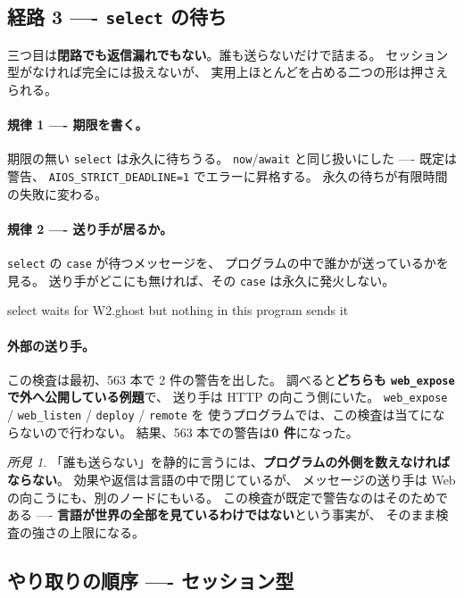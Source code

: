 \documentclass[11pt,a4paper]{ltjsarticle}
\theoremstyle{definition}
\theoremstyle{remark}
\newtheorem{finding}[theorem]{所見}
\begin{document}
\subsection{経路 3 ---- \texttt{select} の待ち}
\label{sec:select3}

三つ目は\textbf{閉路でも返信漏れでもない}。誰も送らないだけで詰まる。
セッション型がなければ完全には扱えないが、
実用上ほとんどを占める二つの形は押さえられる。

\paragraph{規律 1 ---- 期限を書く。}
期限の無い \texttt{select} は永久に待ちうる。
\texttt{now}/\texttt{await} と同じ扱いにした ---- 既定は警告、
\texttt{AIOS\_STRICT\_DEADLINE=1} でエラーに昇格する。
永久の待ちが有限時間の失敗に変わる。

\paragraph{規律 2 ---- 送り手が居るか。}
\texttt{select} の \texttt{case} が待つメッセージを、
プログラムの中で誰かが送っているかを見る。
送り手がどこにも無ければ、その \texttt{case} は永久に発火しない。

\begin{term}
[warn] select waits for W2.ghost but nothing in this program sends it
\end{term}

\paragraph{外部の送り手。}
この検査は最初、563 本で 2 件の警告を出した。
調べると\textbf{どちらも \texttt{web\_expose} で外へ公開している例題}で、
送り手は HTTP の向こう側にいた。
\texttt{web\_expose} / \texttt{web\_listen} / \texttt{deploy} / \texttt{remote} を
使うプログラムでは、この検査は当てにならないので行わない。
結果、563 本での警告は\textbf{0 件}になった。

\begin{finding}
「誰も送らない」を静的に言うには、\textbf{プログラムの外側を数えなければならない}。
効果や返信は言語の中で閉じているが、
メッセージの送り手は Web の向こうにも、別のノードにもいる。
この検査が既定で警告なのはそのためである ----
\textbf{言語が世界の全部を見ているわけではない}という事実が、
そのまま検査の強さの上限になる。
\end{finding}

\subsection{やり取りの順序 ---- セッション型}
\label{sec:session}
\end{document}
